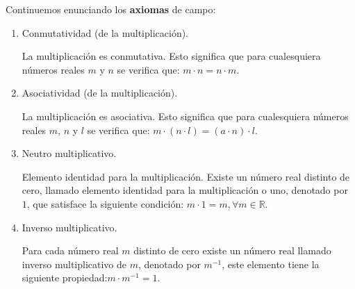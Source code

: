 \documentclass[11pt]{article}
\newcommand{\R}{\mathbb{R}}
\begin{document}
Continuemos enunciando los \textbf{axiomas} de campo:

\begin{enumerate}[label=M\arabic*.]
    \item Conmutatividad (de la multiplicación).
    
    La multiplicación es conmutativa. Esto significa que para cualesquiera números reales $m$ y $n$ se verifica que: $ m \cdot n = n \cdot m $.
    \item Asociatividad (de la multiplicación).
    
    La multiplicación es asociativa. Esto significa que para cualesquiera números reales $m$, $n$ y $l$ se verifica que: $ m \cdot (n \cdot l) = (a \cdot n) \cdot l $.
    \item Neutro multiplicativo.
    
    Elemento identidad para la multiplicación. Existe un número real distinto de cero, llamado elemento identidad para la multiplicación o uno, denotado por $1$, que satisface la siguiente condición: $ m \cdot 1 = m,\forall m \in \R $.
    \item Inverso multiplicativo.
    
    Para cada número real $m$ distinto de cero existe un número real llamado inverso multiplicativo de $m$, denotado por $m^{-1}$, este elemento tiene la siguiente propiedad:$m \cdot m^{-1} = 1$.
\end{enumerate}
\end{document}
